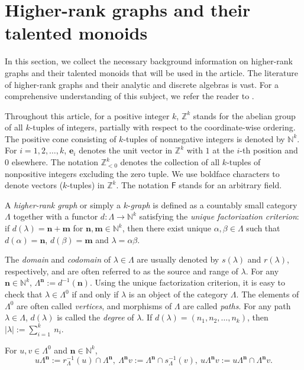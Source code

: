 \documentclass[a4paper,reqno,12pt]{amsart}
\numberwithin{equation}{section}
\theoremstyle{definition}
\theoremstyle{remark}
\newcommand{\N}{\mathbf{n}}
\newcommand{\M}{\mathbf{m}}
\begin{document}
\section{Higher-rank graphs and their talented monoids}\label{sec prelim}
In this section, we collect the necessary background information on higher-rank graphs and their talented monoids that will be used in the article. The literature of higher-rank graphs and their analytic and discrete algebras is vast. For a comprehensive understanding of this subject, we refer the reader to \cite{KumjianPask,Pino,HMPS1,HMPS2}. 

Throughout this article, for a positive integer $k$, $\mathbb{Z}^k$ stands for the abelian group of all $k$-tuples of integers, partially with respect to the coordinate-wise ordering. The positive cone consisting of $k$-tuples of nonnegative integers is denoted by $\mathbb{N}^k$. For $i=1,2,\ldots,k$, $\mathbf{e}_i$ denotes the unit vector in $\mathbb{Z}^k$ with $1$ at the $i$-th position and $0$ elsewhere. The notation $\mathbb{Z}_{<0}^k$ denotes the collection of all $k$-tuples of nonpositive integers excluding the zero tuple. We use boldface characters to denote vectors ($k$-tuples) in $\mathbb{Z}^k$. The notation $\mathsf{F}$ stands for an arbitrary field.  

A \emph{higher-rank graph} or simply a $k$-\emph{graph} is defined as a countably small category $\Lambda$ together with a functor $d:\Lambda\longrightarrow \mathbb{N}^k$ satisfying the \emph{unique factorization criterion}: if $d(\lambda)=\N+\M$ for $\N,\M\in \mathbb{N}^k$, then there exist unique $\alpha,\beta\in \Lambda$ such that $d(\alpha)=\N$, $d(\beta)=\M$ and $\lambda=\alpha\beta$. 

The \emph{domain} and \emph{codomain} of $\lambda\in \Lambda$ are usually denoted by $s(\lambda)$ and $r(\lambda)$, respectively, and are often referred to as the source and range of $\lambda$. For any $\N\in \mathbb{N}^k$, $\Lambda^\N:=d^{-1}(\N)$. Using the unique factorization criterion, it is easy to check that $\lambda\in \Lambda^0$ if and only if $\lambda$ is an object of the category $\Lambda$. The elements of $\Lambda^0$ are often called \emph{vertices}, and morphisms of $\Lambda$ are called \emph{paths}. For any path $\lambda\in \Lambda$, $d(\lambda)$ is called the \emph{degree} of $\lambda$. If $d(\lambda)=(n_1,n_2,\ldots,n_k)$, then $|\lambda|:=\displaystyle{\sum_{i=1}^{k}}~ n_i$.

For $u,v\in \Lambda^0$ and $\N\in \mathbb{N}^k$, \[u\Lambda^\mathbf{n}:=r_\Lambda^{-1}(u)\cap \Lambda^\mathbf{n},~\Lambda^\mathbf{n} v:=\Lambda^\mathbf{n}\cap s_\Lambda^{-1}(v),~u\Lambda^\mathbf{n} v:=u\Lambda^\mathbf{n} \cap \Lambda^\mathbf{n} v.\] 
\end{document}
